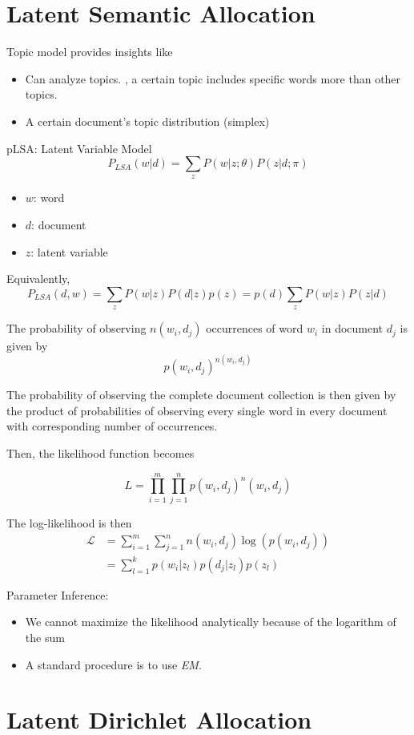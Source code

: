 
\section{Latent Semantic Allocation}
\label{sec:lsa}

Topic model provides insights like
\begin{itemize}
	\item Can analyze topics. \eg, a certain topic includes specific words more than other topics. 
	\item A certain document's topic distribution (simplex)
\end{itemize}


pLSA: Latent Variable Model
$$P_{LSA}(w|d) = \sum_{z}P(w|z;\theta)P(z|d;\pi)$$
\begin{itemize}
	\item $w$: word
	\item $d$: document
	\item $z$: latent variable
\end{itemize}

Equivalently, 
$$P_{LSA}(d,w) = \sum_{z}P(w|z)P(d|z)p(z) = p(d)\sum_{z}P(w|z)P(z|d)$$

The probability of observing $n(w_i, d_j)$ occurrences of word $w_i$ in document $d_j$ is given by
$$p(w_i, d_j)^{n(w_i, d_j)}$$

The probability of observing the complete document collection is then given by the product of probabilities of observing every single word in every document with corresponding number of occurrences.

Then, the likelihood function becomes

$$L = \prod_{i=1}^{m}\prod_{j=1}^{n}p(w_i, d_j)^n(w_i, d_j)$$

The log-likelihood is then
\begin{align*}
	\mathcal{L} &= \sum_{i=1}^{m}\sum_{j=1}^{n}n(w_i, d_j)\log (p(w_i, d_j))\\
				&= \sum_{l=1}^kp(w_i|z_l)p(d_j|z_l)p(z_l) 
\end{align*}

Parameter Inference:
\begin{itemize}
	\item We cannot maximize the likelihood analytically because of the logarithm of the sum
	\item A standard procedure is to use \textit{EM}. 
\end{itemize}




\section{Latent Dirichlet Allocation}
\label{sec:topic_modeling_lda}

